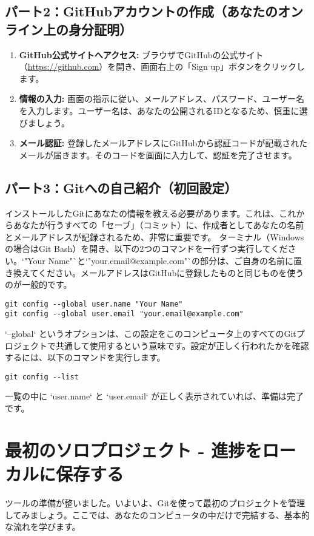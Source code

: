 \documentclass{ltjsarticle}
\begin{document}
\subsection{パート2：GitHubアカウントの作成（あなたのオンライン上の身分証明）}
\begin{enumerate}
    \item \textbf{GitHub公式サイトへアクセス:} ブラウザでGitHubの公式サイト（\url{https://github.com}）を開き、画面右上の「Sign up」ボタンをクリックします。
    \item \textbf{情報の入力:} 画面の指示に従い、メールアドレス、パスワード、ユーザー名を入力します。ユーザー名は、あなたの公開されるIDとなるため、慎重に選びましょう。
    \item \textbf{メール認証:} 登録したメールアドレスにGitHubから認証コードが記載されたメールが届きます。そのコードを画面に入力して、認証を完了させます。
\end{enumerate}

\subsection{パート3：Gitへの自己紹介（初回設定）}
インストールしたGitにあなたの情報を教える必要があります。これは、これからあなたが行うすべての「セーブ」（コミット）に、作成者としてあなたの名前とメールアドレスが記録されるため、非常に重要です。
ターミナル（Windowsの場合はGit Bash）を開き、以下の2つのコマンドを一行ずつ実行してください。`"Your Name"`と`"your.email@example.com"`の部分は、ご自身の名前に置き換えてください。メールアドレスはGitHubに登録したものと同じものを使うのが一般的です。
\begin{verbatim}
git config --global user.name "Your Name"
git config --global user.email "your.email@example.com"
\end{verbatim}
`--global` というオプションは、この設定をこのコンピュータ上のすべてのGitプロジェクトで共通して使用するという意味です。設定が正しく行われたかを確認するには、以下のコマンドを実行します。
\begin{verbatim}
git config --list
\end{verbatim}
一覧の中に `user.name` と `user.email` が正しく表示されていれば、準備は完了です。

\section{最初のソロプロジェクト - 進捗をローカルに保存する}
ツールの準備が整いました。いよいよ、Gitを使って最初のプロジェクトを管理してみましょう。ここでは、あなたのコンピュータの中だけで完結する、基本的な流れを学びます。
\end{document}
